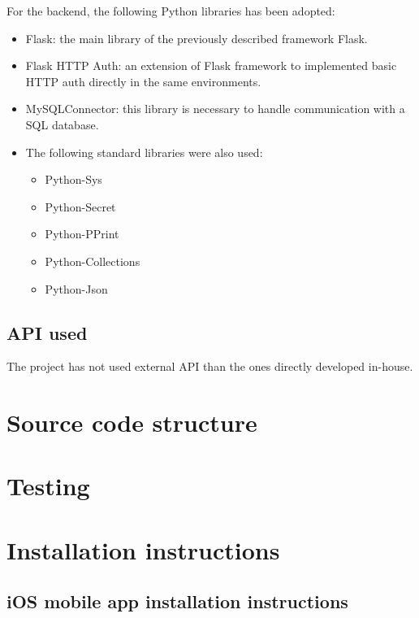 \documentclass{article}
\begin{document}
For the backend, the following Python libraries has been adopted:
\begin{itemize}
	\item Flask: the main library of the previously described framework Flask.
	\item Flask HTTP Auth: an extension of Flask framework to implemented basic HTTP auth directly in the same environments.
	\item MySQLConnector: this library is necessary to handle communication with a SQL database.
	\item The following standard libraries were also used:
			\begin{itemize}
				\item Python-Sys
				\item Python-Secret
				\item Python-PPrint
				\item Python-Collections
				\item Python-Json
			\end{itemize}
\end{itemize}



\subsection{API used}
The project has not used external API than the ones directly developed in-house.

\section{Source code structure}

\section{Testing}

\section{Installation instructions}

\subsection{iOS mobile app installation instructions}
\end{document}
